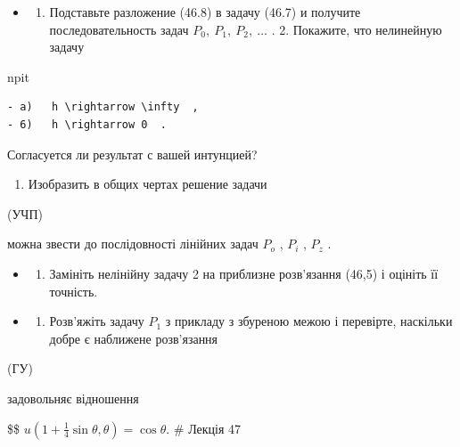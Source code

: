 \documentclass[
  ukrainian,
]{article}
\providecommand{\tightlist}{%
  \setlength{\itemsep}{0pt}\setlength{\parskip}{0pt}}
\begin{document}
\begin{itemize}
\tightlist
\item
  \begin{enumerate}
  \def\labelenumi{\arabic{enumi}.}
  \tightlist
  \item
    Подставьте разложение (46.8) в задачу (46.7) и получите
    последовательность задач \(P_0,\ P_1,\ P_2,\ \dots\) . 2. Покажите,
    что нелинейную задачу
  \end{enumerate}
\end{itemize}

npit

\begin{verbatim}
- a)   h \rightarrow \infty  ,
- 6)   h \rightarrow 0  .
\end{verbatim}

Согласуется ли результат с вашей интунцией?

\begin{enumerate}
\def\labelenumi{\arabic{enumi}.}
\setcounter{enumi}{3}
\tightlist
\item
  Изобразить в общих чертах решение задачи
\end{enumerate}

(УЧП)

можна звести до послідовності лінійних задач \(P_{o}\) , \(P_{i}\) ,
\(P_{z}\) .

\begin{itemize}
\tightlist
\item
  \begin{enumerate}
  \def\labelenumi{\arabic{enumi}.}
  \setcounter{enumi}{2}
  \tightlist
  \item
    Замініть нелінійну задачу 2 на приблизне розв'язання (46,5) і
    оцініть її точність.
  \end{enumerate}
\item
  \begin{enumerate}
  \def\labelenumi{\arabic{enumi}.}
  \setcounter{enumi}{3}
  \tightlist
  \item
    Розв'яжіть задачу \(P_1\) з прикладу з збуреною межою і перевірте,
    наскільки добре є наближене розв'язання
  \end{enumerate}
\end{itemize}

(ГУ)

задовольняє відношення

\$\$ \(u\left(1 + \frac{1}{4}\sin\theta, \theta\right) = \cos\theta.\)
\# Лекція 47
\end{document}
